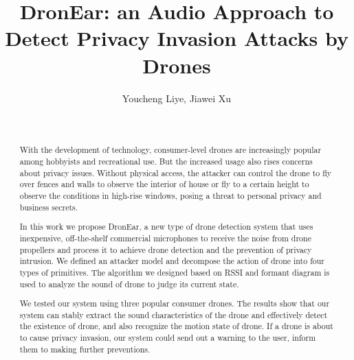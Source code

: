 \documentclass{sig-alternate-10pt}
\begin{document}
\title{DronEar: an Audio Approach to Detect Privacy Invasion Attacks by Drones}

%
\author{
Youcheng Liye, Jiawei Xu
\\
\and %
       \\
       }

\maketitle

\begin{abstract}

With the development of technology, consumer-level drones are increasingly popular among hobbyists and recreational use. But the increased usage also rises concerns about privacy issues. Without physical access, the attacker can control the drone to fly over fences and walls to observe the interior of  house or fly to a certain height to observe the conditions in high-rise windows, posing a threat to personal privacy and business secrets. 

In this work we propose DronEar, a new type of drone detection system that uses inexpensive, off-the-shelf commercial microphones to receive the noise from drone propellers and process it to achieve drone detection and the prevention of privacy intrusion. We defined an attacker model and decompose the action of drone into four types of primitives. The algorithm we designed based on RSSI and formant diagram is used to analyze the sound of drone to judge its current state.

We tested our system using three popular consumer drones. The results show that our system can stably extract the sound characteristics of the drone and effectively detect the existence of drone, and also recognize the motion state of drone. If a drone is about to cause privacy invasion, our system could send out a warning to the user, inform them to making further preventions.


\end{abstract}


\end{document}
